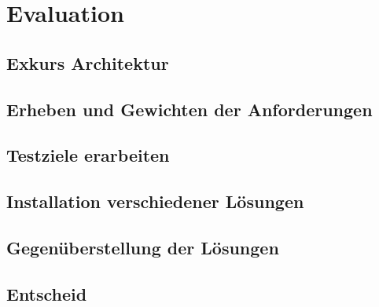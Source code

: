 
\section{Evaluation}
\subsection{Exkurs Architektur}







\subsection{Erheben und Gewichten der Anforderungen}

\subsection{Testziele erarbeiten}


\subsection{Installation verschiedener Lösungen}





\subsection{Gegenüberstellung der Lösungen}


\subsection{Entscheid}
